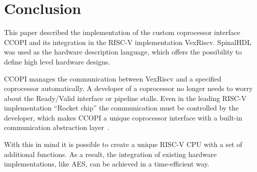 \documentclass[twoside,twocolumn]{article}
\begin{document}
\section{Conclusion}
This paper described the implementation of the custom coprocessor
interface CCOPI and its integration in the RISC-V implementation
VexRiscv. SpinalHDL was used as the hardware description language,
which offers the possibility to define high level hardware designs.

CCOPI manages the communication between VexRiscv and a specified
coprocessor automatically. A developer of a coprocessor no longer needs
to worry about the Ready/Valid interface or pipeline stalls. Even in the
leading RISC-V implementation ``Rocket chip'' the communication must be
controlled by the developer,
which makes CCOPI a unique coprocessor interface with a built-in
communication abstraction layer~\cite{rocket-chip_rocc}.

With this in mind it is possible to create a unique
RISC-V CPU with a set of additional functions. As a result, the integration of
existing hardware implementations, like AES, can be achieved in a 
time-efficient way. 



\end{document}
